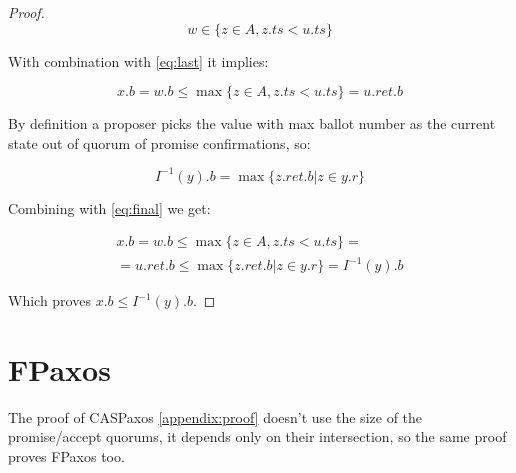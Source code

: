 \documentclass[12pt]{article}
\theoremstyle{definition}
\begin{document}
\begin{appendices}
\begin{proof}
  \begin{equation}
    w \in \{ z \in A, z.ts < u.ts \}
  \end{equation}

  With combination with \ref{eq:last} it implies:

  \begin{equation} \label{eq:final}
    x.b = w.b \leq \max \{ z \in A, z.ts < u.ts \} = u.ret.b
  \end{equation}

  By definition a proposer picks the value with max ballot number as the current state out of quorum of promise confirmations, so:

  \begin{equation}
    I^{-1}(y).b = \max \{ z.ret.b | z \in y.r \}
  \end{equation}

  Combining with \ref{eq:final} we get:

  \begin{multline}
    x.b = w.b \leq \max \{ z \in A, z.ts < u.ts \} = \\
    = u.ret.b \leq \max \{ z.ret.b | z \in y.r \} = I^{-1}(y).b
  \end{multline}

  Which proves $x.b \leq I^{-1}(y).b$.

\end{proof}

\section{FPaxos}
\label{appendix:fpaxos}
The proof of CASPaxos \ref{appendix:proof} doesn't use the size of the promise/accept quorums, it depends only on their intersection, so the same proof proves FPaxos too.

\end{appendices}

\newpage
\end{document}
